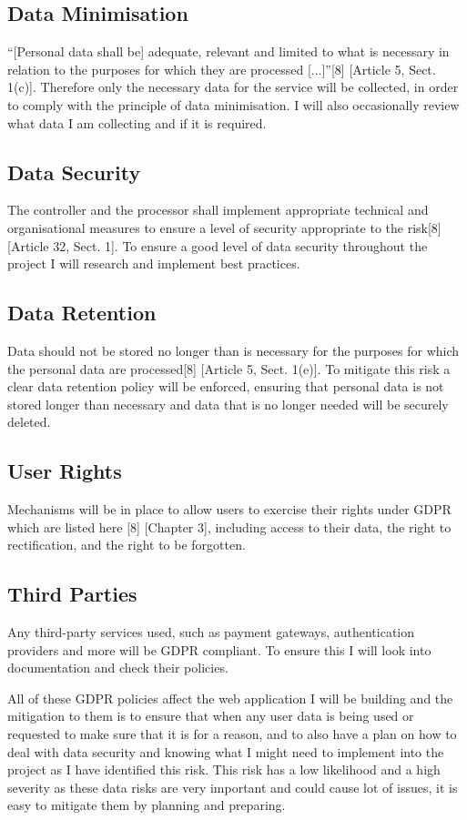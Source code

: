 \documentclass[]{project_report}
\begin{document}
\subsection{Data Minimisation}
“[Personal data shall be] adequate, relevant and limited to what is necessary in relation to the purposes for which they are processed [...]”[8] [Article 5, Sect. 1(c)]. Therefore only the necessary data for the service will be collected, in order to comply with the principle of data minimisation. I will also occasionally review what data I am collecting and if it is required.

\subsection{Data Security}
The controller and the processor shall implement appropriate technical and organisational measures to ensure a level of security appropriate to the risk[8] [Article 32, Sect. 1]. To ensure a good level of data security throughout the project I will research and implement best practices.

\subsection{Data Retention}
Data should not be stored no longer than is necessary for the purposes for which the personal data are processed[8] [Article 5, Sect. 1(e)]. To mitigate this risk a clear data retention policy will be enforced, ensuring that personal data is not stored longer than necessary and data that is no longer needed will be securely deleted.

\subsection{User Rights}
Mechanisms will be in place to allow users to exercise their rights under GDPR which are listed here [8] [Chapter 3], including access to their data, the right to rectification, and the right to be forgotten.

\subsection{Third Parties}
Any third-party services used, such as payment gateways, authentication providers and more will be GDPR compliant. To ensure this I will look into documentation and check their policies.

All of these GDPR policies affect the web application I will be building and the mitigation to them is to ensure that when any user data is being used or requested to make sure that it is for a reason, and to also have a 
plan on how to deal with data security and knowing what I might need to implement into the project as I have identified this risk. This risk has a low likelihood and a high severity as these data risks are very important and could cause lot of issues, it is easy to mitigate them by planning and preparing.
\end{document}
